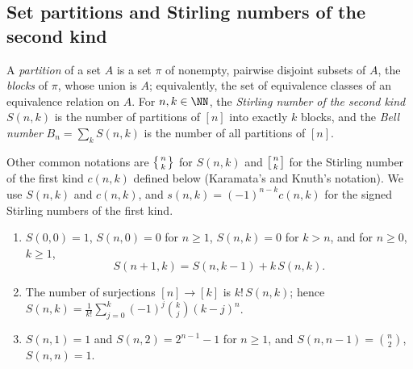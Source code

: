 \subsection{Set partitions and Stirling numbers of the second kind}\label{combinatorics:subsection-stirling-second}

\begin{definition}\label{combinatorics:definition-stirling-second}
A \emph{partition} of a set $A$ is a set $\pi$ of nonempty, pairwise disjoint subsets of $A$, the \emph{blocks} of $\pi$, whose union is $A$; equivalently, the set of equivalence classes of an
equivalence relation on $A$. For $n, k \in \NN$, the \emph{Stirling number of the second kind} $S(n, k)$ is the number of partitions of $[n]$ into exactly $k$ blocks, and the \emph{Bell number}
$B_n = \sum_kS(n, k)$ is the number of all partitions of $[n]$.
\end{definition}

\begin{notation}\label{combinatorics:notation-stirling}
Other common notations are $\left\{ n \atop k \right\}$ for $S(n, k)$ and $\left[ n \atop k \right]$ for the Stirling number of the first kind $c(n, k)$ defined below (Karamata's and Knuth's
notation). We use $S(n, k)$ and $c(n, k)$, and $s(n, k) = (-1)^{n-k}c(n, k)$ for the signed Stirling numbers of the first kind.
\end{notation}

\begin{proposition}\label{combinatorics:proposition-stirling-second}
\begin{enumerate}
\item $S(0, 0) = 1$, $S(n, 0) = 0$ for $n \geq 1$, $S(n, k) = 0$ for $k > n$, and for $n \geq 0$, $k \geq 1$,
\[
S(n + 1, k) = S(n, k - 1) + k\,S(n, k).
\]
\item The number of surjections $[n] \to [k]$ is $k!\,S(n, k)$; hence $S(n, k) = \frac{1}{k!}\sum_{j=0}^{k}(-1)^j\binom{k}{j}(k - j)^n$.
\item $S(n, 1) = 1$ and $S(n, 2) = 2^{n-1} - 1$ for $n \geq 1$, and $S(n, n - 1) = \binom{n}{2}$, $S(n, n) = 1$.
\end{enumerate}
\end{proposition}

